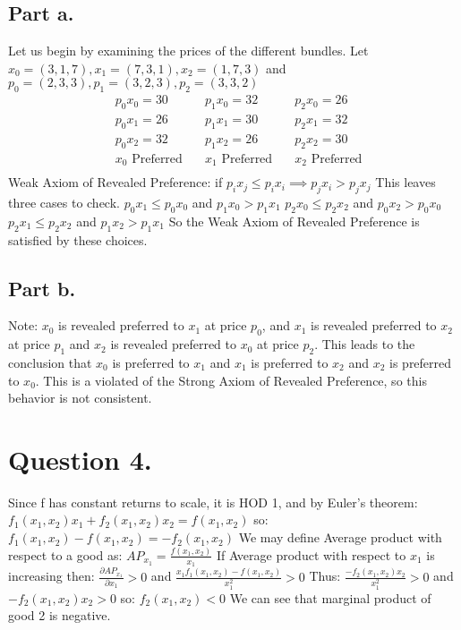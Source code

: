 \documentclass[10pt, letterpaper]{paper}
\begin{document}
\subsection*{Part a.}
Let us begin by examining the prices of the different bundles.
Let $x_0 = (3,1,7), x_1 = (7,3,1), x_2 = (1,7,3)$ and $p_0 = (2,3,3), p_1 = (3,2,3), p_2 = (3,3,2)$
\begin{equation*}
\begin{alignedat}{6}
&p_0 x_0 = 30 \quad &p_1 x_0 = 32 \quad & p_2 x_0 = 26 \\
&p_0 x_1 = 26 \quad &p_1 x_1 = 30 \quad & p_2 x_1 = 32 \\
&p_0 x_2 = 32 \quad &p_1 x_2 = 26 \quad & p_2 x_2 = 30 \\
&x_0 \text{ Preferred} \quad &x_1 \text{ Preferred} \quad &x_2 \text{ Preferred}\\
\end{alignedat}
\end{equation*}
Weak Axiom of Revealed Preference: if $p_i x_j \leq p_i x_i \implies p_j x_i > p_j x_j$
\newline
This leaves three cases to check.
\newline
$p_0 x_1 \leq p_0 x_0$ and $p_1 x_0 > p_1 x_1$ \checkmark
\newline
$p_2 x_0 \leq p_2 x_2$ and $p_0 x_2 > p_0 x_0$ \checkmark
\newline
$p_2 x_1 \leq p_2 x_2$ and $p_1 x_2 > p_1 x_1$ \checkmark
\newline
So the Weak Axiom of Revealed Preference is satisfied by these choices.

\subsection*{Part b.}
Note: $x_0$ is revealed preferred to $x_1$ at price $p_0$, and $x_1$ is revealed preferred to $x_2$ at price $p_1$ and $x_2$ is revealed preferred to $x_0$ at price $p_2$. 
This leads to the conclusion that $x_0$ is preferred to $x_1$ and $x_1$ is preferred to $x_2$ and $x_2$ is preferred to $x_0$. This is a violated of the Strong Axiom of Revealed Preference, so this behavior is not consistent.



\section*{Question 4.}
Since f has constant returns to scale, it is HOD 1, and by Euler's theorem: $f_1 (x_1,x_2) x_1 + f_2 (x_1,x_2 ) x_2 = f( x_1, x_2)$
so: $f_1 (x_1,x_2) - f(x_1,x_2) = -f_2 (x_1,x_2)$
\newline
We may define Average product with respect to a good as: $AP_{x_1} = \frac{f( x_1, x_2 )}{x_1}$
\newline
If Average product with respect to $x_1$ is increasing then: $\frac{ \partial AP_{x_1} }{ \partial x_1} > 0$ and $\frac{ x_1 f_1 (x_1,x_2) - f( x_1, x_2 ) }{x_1^2} > 0$
\newline
Thus: $\frac{ -f_2 (x_1,x_2) x_2 }{x_1^2} > 0$ and $-f_2 (x_1,x_2) x_2 > 0$ so: $f_2 (x_1,x_2) < 0$
\newline
We can see that marginal product of good 2 is negative.
\end{document}
